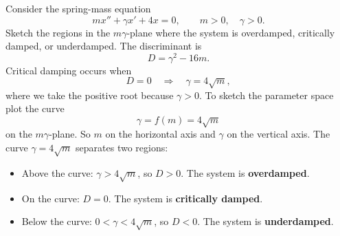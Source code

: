 \documentclass[10pt,letterpaper]{article}
\begin{document}
\begin{example}[3]{
Consider the spring-mass equation
\[
mx''+\gamma x'+4x=0,
\qquad m>0,\quad \gamma>0.
\]
Sketch the regions in the $m\gamma$-plane where the system is
overdamped, critically damped, or underdamped.
}
The discriminant is
\[
D=\gamma^2-16m.
\]
Critical damping occurs when
\[
D=0
\quad\Rightarrow\quad
\gamma=4\sqrt{m},
\]
where we take the positive root because $\gamma>0$. To sketch the parameter space plot the curve
$$
    \gamma = f(m) = 4\sqrt{m} 
$$
on the $m\gamma$-plane. So $m$ on the horizontal axis and $\gamma$ on the vertical
axis. The curve $\gamma=4\sqrt{m}$ separates two regions:
\begin{itemize}
    \item Above the curve: $\gamma>4\sqrt{m}$, so $D>0$.
    The system is \textbf{overdamped}.
    \item On the curve: $D=0$.
    The system is \textbf{critically damped}.
    \item Below the curve: $0<\gamma<4\sqrt{m}$, so $D<0$.
    The system is \textbf{underdamped}.
\end{itemize}

\begin{figure}[H]
\centering
{}

\end{figure}
\end{example}
\end{document}
